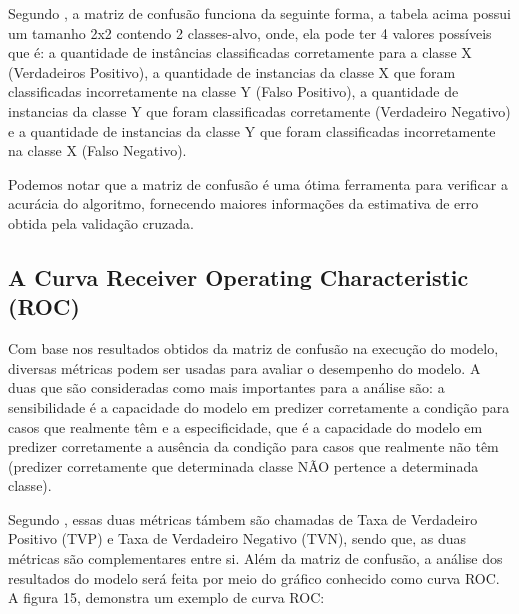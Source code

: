 \par
Segundo , a  matriz de confusão funciona da seguinte forma, a tabela acima possui um tamanho 2x2 contendo 2 classes-alvo, onde, ela pode ter 4 valores possíveis que é: a quantidade de instâncias classificadas corretamente para a classe X (Verdadeiros Positivo), a quantidade de instancias da classe X que foram classificadas incorretamente na classe Y (Falso Positivo), a quantidade de instancias da classe Y que foram classificadas corretamente (Verdadeiro Negativo) e a quantidade de instancias da classe Y que foram classificadas incorretamente na classe X (Falso Negativo).

\par
Podemos notar que a matriz de confusão é uma ótima ferramenta para verificar a acurácia do algoritmo, fornecendo maiores informações da estimativa de erro obtida pela validação cruzada.

\subsection{A Curva Receiver Operating Characteristic (ROC)}

\par
Com base nos resultados obtidos da matriz de confusão na execução do modelo, diversas métricas podem ser usadas para avaliar o desempenho do modelo. A duas que são consideradas como mais importantes para a análise são: a sensibilidade é a capacidade do modelo em predizer corretamente a condição para casos que realmente têm e a especificidade, que é a capacidade do modelo em predizer corretamente a ausência da condição para casos que realmente não têm (predizer corretamente que determinada classe NÃO pertence a determinada classe)\cite{Cesar, Carvalho2014}.

\par
Segundo , essas duas métricas támbem são chamadas de Taxa de Verdadeiro Positivo (TVP) e Taxa de Verdadeiro Negativo (TVN), sendo que, as duas métricas são complementares entre si. Além da matriz de confusão, a análise dos resultados do modelo será feita por meio do gráfico conhecido como curva ROC. A figura 15, demonstra um exemplo de curva ROC:

